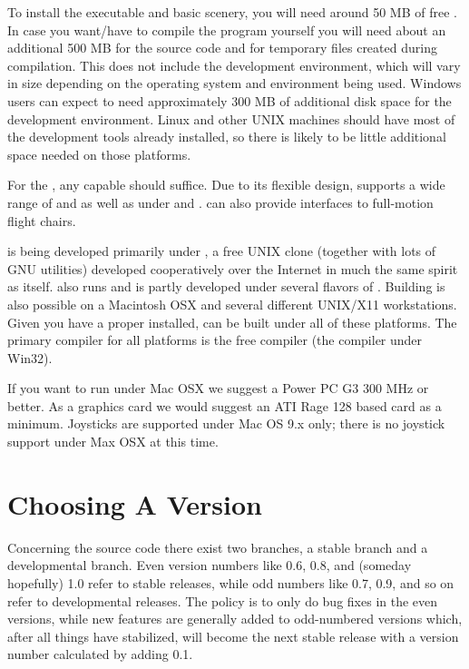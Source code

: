 To install the executable and basic scenery, you will need around 50 MB of free . In case you want/have to compile the program yourself you will need about an additional
500 MB for the source code and for temporary files created during compilation. This does not
include the development environment, which will vary in size depending on the operating system
and environment being used.  Windows users can expect to need approximately 300 MB of additional
disk space for the development environment.  Linux and other UNIX machines should have most of
the development tools already installed, so there is likely to be little additional space
needed on those platforms.

For the , any capable  should suffice.
Due to its flexible design, \FlightGear{} supports a wide range of  and
 as well as  under  and . 
\FlightGear{} can also provide interfaces to full-motion flight chairs.

\FlightGear{} is being developed primarily under , a free UNIX clone
(together with lots of GNU utilities) developed cooperatively over the Internet in much
the same spirit as \FlightGear{} itself. \FlightGear{} also runs and is partly developed
under several flavors of . Building \FlightGear{} is also possible on a Macintosh OSX
and several different UNIX/X11 workstations. Given you have a proper  installed,
\FlightGear{} can be built under all of these platforms. The primary compiler for all platforms is
the free  compiler (the   compiler under Win32).

If you want to run \FlightGear{} under Mac OSX we suggest a Power PC G3 300 MHz or better. As a
graphics card we would suggest an ATI Rage 128 based card as a minimum. Joysticks are supported
under Mac OS 9.x only; there is no joystick support under Max OSX at this time.


\section{Choosing A Version}

Concerning the \FlightGear{} source code there exist two branches, a stable branch and a
developmental branch. Even version numbers
like 0.6, 0.8, and (someday hopefully) 1.0 refer to stable releases, while odd
numbers like 0.7, 0.9, and so on refer to developmental releases. The policy is to only do
bug fixes in the even versions, while new features are generally added to odd-numbered
versions which, after all things have stabilized, will become the next stable release
with a version number calculated by adding 0.1.\label{branches}

